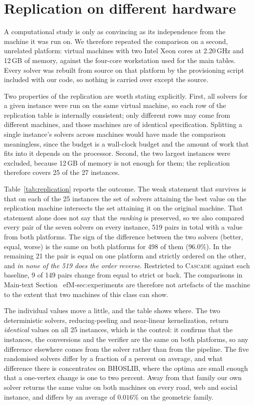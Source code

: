 \documentclass[preprint,authoryear,11pt]{elsarticle}
\theoremstyle{definition}
\begin{document}



\section{Replication on different hardware}
\label{sec:replication}

A computational study is only as convincing as its independence from the machine
it was run on. We therefore repeated the comparison on a second, unrelated
platform: virtual machines with two Intel Xeon cores at 2.20\,GHz and 12\,GB of
memory, against the four-core workstation used for the main tables. Every solver
was rebuilt from source on that platform by the provisioning script included
with our code, so nothing is carried over except the source.

Two properties of the replication are worth stating explicitly. First, all
solvers for a given instance were run on the same virtual machine, so each row
of the replication table is internally consistent; only different rows may come
from different machines, and those machines are of identical specification.
Splitting a single instance's solvers across machines would have made the
comparison meaningless, since the budget is a wall-clock budget and the amount
of work that fits into it depends on the processor. Second, the two largest
instances were excluded, because 12\,GB of memory is not enough for them; the
replication therefore covers 25 of the 27 instances.

Table~\ref{tab:replication} reports the outcome. The weak statement that
survives is that on each of the 25 instances the set of solvers attaining the
best value on the replication machine intersects the set attaining it on the
original machine. That statement alone does not say that the \emph{ranking} is
preserved, so we also compared every pair of the seven solvers on every
instance, 519 pairs in total with a value from both platforms. The sign of the
difference between the two solvers (better, equal, worse) is the same on both
platforms for 498 of them ($96.0\%$). In the remaining 21 the pair is equal on
one platform and strictly ordered on the other, and \emph{in none of the 519 does
the order reverse}. Restricted to \textsc{Cascade} against each baseline, 9 of
149 pairs change from equal to strict or back. The comparisons in
Main-text Section~
ef{M-sec:experiments} are therefore not artefacts of the machine to the
extent that two machines of this class can show.

The individual values move a little, and the table shows where. The two
deterministic solvers, reducing-peeling and near-linear kernelization, return
\emph{identical} values on all 25 instances, which is the control: it confirms that
the instances, the conversions and the verifier are the same on both platforms,
so any difference elsewhere comes from the solver rather than from the pipeline.
The five randomised solvers differ by a fraction of a percent on average, and
what difference there is concentrates on BHOSLIB, where the optima are small
enough that a one-vertex change is one to two percent. Away from that family our
own solver returns the same value on both machines on every road, web and social
instance, and differs by an average of $0.016\%$ on the geometric family.
\end{document}
